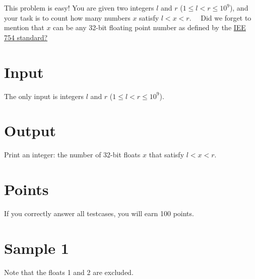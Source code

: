 \noindent

This problem is easy! You are given two integers $l$ and $r$ ($1 \leq l < r \leq 10^9$), and your task
is to count how many numbers $x$ satisfy $l < x < r$.
\
\
Did we forget to mention that $x$ can be any 32-bit floating point number as defined by the
\href{https://sci-hub.3800808.com/10.1109/ieeestd.2008.4610935}{IEE 754 standard?}


\section*{Input}
\noindent
The only input is integers $l$ and $r$ ($1 \leq l < r \leq 10^9$).

\section*{Output}
\noindent
Print an integer: the number of 32-bit floats $x$ that satisfy $l < x < r$.


\section*{Points}
If you correctly answer all testcases, you will earn 100 points.

\section*{Sample 1}
Note that the floats 1 and 2 are excluded.
